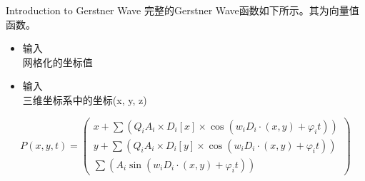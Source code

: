 \documentclass[handout,t]{beamer}
\begin{document}
\begin{frame}{Introduction to Gerstner Wave}
  完整的Gerstner Wave函数如下所示。其为向量值函数。
  \begin{itemize}
    \item 输入\\
      网格化的坐标值\\ 
    \item 输入 \\
      三维坐标系中的坐标(x, y, z) \\
  \end{itemize}
  $$
  P(x, y, t) = 
    \begin{pmatrix}
    x + \sum(Q_iA_i \times D_i[x] \times \cos(w_iD_i \cdot(x, y) + \varphi_it))\\
    y + \sum(Q_iA_i \times D_i[y] \times \cos(w_iD_i \cdot(x, y) + \varphi_it))\\
    \sum(A_i\sin(w_iD_i \cdot(x,y) + \varphi_i t))
    \end{pmatrix}
  $$
\end{frame}
\end{document}
